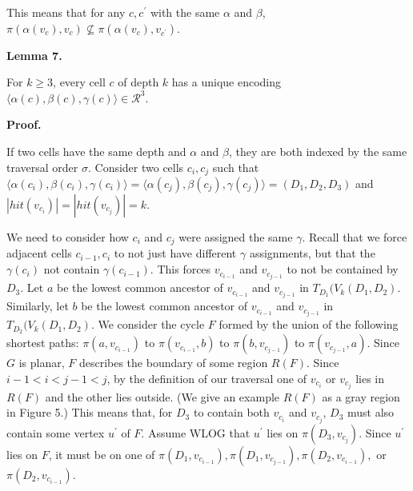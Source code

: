 \par
\par
This means that for any $c,c^{\prime}$ with the same $\alpha$ and $\beta$, $\pi(\alpha(v_{c}),v_{c})\not\subseteq\pi(\alpha(v_{c}),v_{c^{\prime}})$.
\par
\par
\par\medskip\noindent\textbf{Lemma 7.}\par
For $k\geq 3$, every cell $c$ of depth $k$ has a unique encoding $\langle\alpha(c),\beta(c),\gamma(c)\rangle\in\mathcal{R}^{3}$.
\par
\par
\par
\par\medskip\noindent\textbf{Proof.}\par
If two cells have the same depth and $\alpha$ and $\beta$, they are both indexed by the same traversal order $\sigma$. Consider two cells $c_{i},c_{j}$ such that $\langle\alpha(c_{i}),\beta(c_{i}),\gamma(c_{i})\rangle=\langle\alpha(c_{j}),%
\beta(c_{j}),\gamma(c_{j})\rangle=(D_{1},D_{2},D_{3})$ and $|\mathit{hit}(v_{c_{i}})|=|\mathit{hit}(v_{c_{j}})|=k$.
\par
\par
We need to consider how $c_{i}$ and $c_{j}$ were assigned the same $\gamma$. Recall that we force adjacent cells $c_{i-1},c_{i}$ to not just have different $\gamma$ assignments, but that the $\gamma(c_{i})$ not contain $\gamma(c_{i-1})$. This forces $v_{c_{i-1}}$ and $v_{c_{j-1}}$ to not be contained by $D_{3}$. Let $a$ be the lowest common ancestor of $v_{c_{i-1}}$ and $v_{c_{j-1}}$ in $T_{D_{1}}(V_{k}(D_{1},D_{2})$. Similarly, let $b$ be the lowest common ancestor of $v_{c_{i-1}}$ and $v_{c_{j-1}}$ in $T_{D_{2}}(V_{k}(D_{1},D_{2})$. We consider the cycle $F$ formed by the union of the following shortest paths: $\pi(a,v_{c_{i-1}})$ to $\pi(v_{c_{i-1}},b)$ to $\pi(b,v_{c_{j-1}})$ to $\pi(v_{c_{j-1}},a)$. Since $G$ is planar, $F$ describes the boundary of some region $R(F)$. Since $i-1<i<j-1<j$, by the definition of our traversal one of $v_{c_{i}}$ or $v_{c_{j}}$ lies in $R(F)$ and the other lies outside. (We give an example $R(F)$ as a gray region in Figure 5.) This means that, for $D_{3}$ to contain both $v_{c_{i}}$ and $v_{c_{j}}$, $D_{3}$ must also contain some vertex $u^{\prime}$ of $F$. Assume WLOG that $u^{\prime}$ lies on $\pi(D_{3},v_{c_{j}})$. Since $u^{\prime}$ lies on $F$, it must be on one of $\pi(D_{1},v_{c_{i-1}}),\pi(D_{1},v_{c_{j-1}}),\pi(D_{2},v_{c_{i-1}}),$ or $\pi(D_{2},v_{c_{i-1}})$.

